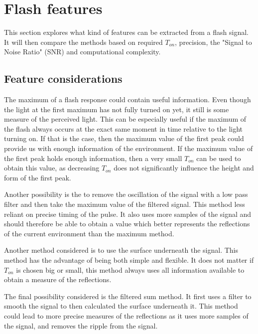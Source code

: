 


\section{Flash features}
This section explores what kind of features can be extracted from a flash signal. It will then compare the methods based on required $T_{on}$, precision, the "Signal to Noise Ratio" (SNR) and computational complexity.

\subsection{Feature considerations}
The maximum of a flash response could contain useful information. Even though the light at the first maximum has not fully turned on yet, it still is some measure of the perceived light. This can be especially useful if the maximum of the flash always occurs at the exact same moment in time relative to the light turning on. If that is the case, then the maximum value of the first peak could provide us with enough information of the environment. If the maximum value of the first peak holds enough information, then a very small $T_{on}$ can be used to obtain this value, as decreasing $T_{on}$ does not significantly influence the height and form of the first peak.

Another possibility is the to remove the oscillation of the signal with a low pass filter and then take the maximum value of the filtered signal. This method less reliant on precise timing of the pulse. It also uses more samples of the signal and should therefore be able to obtain a value which better represents the reflections of the current environment than the maximum method.

Another method considered is to use the surface underneath the signal. This method has the advantage of being both simple and flexible. It does not matter if $T_{on}$ is chosen big or small, this method always uses all information available to obtain a measure of the reflections.

The final possibility considered is the filtered sum method. It first uses a filter to smooth the signal to then calculated the surface underneath it. This method could lead to more precise measures of the reflections as it uses more samples of the signal, and removes the ripple from the signal.

